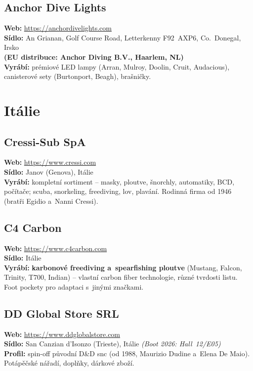 \documentclass[11pt,a4paper]{article}
\begin{document}
\subsection{Anchor Dive Lights}
\textbf{Web:} \url{https://anchordivelights.com} \\
\textbf{Sídlo:} An Grianan, Golf Course Road, Letterkenny F92~AXP6, Co.~Donegal, Irsko \\
\textbf{(EU distribuce: Anchor Diving B.V., Haarlem, NL)} \\
\textbf{Vyrábí:} prémiové LED lampy (Arran, Mulroy, Doolin, Cruit, Audacious), canisterové sety (Burtonport, Beagh), brašničky.

\section{Itálie}

\subsection{Cressi-Sub SpA}
\textbf{Web:} \url{https://www.cressi.com} \\
\textbf{Sídlo:} Janov (Genova), Itálie \\
\textbf{Vyrábí:} kompletní sortiment -- masky, ploutve, šnorchly, automatiky, BCD, počítače; scuba, snorkeling, freediving, lov, plavání. Rodinná firma od 1946 (bratři Egidio a~Nanni Cressi).

\subsection{C4 Carbon}
\textbf{Web:} \url{https://www.c4carbon.com} \\
\textbf{Sídlo:} Itálie \\
\textbf{Vyrábí:} \textbf{karbonové freediving a~spearfishing ploutve} (Mustang, Falcon, Trinity, T700, Indian) -- vlastní carbon fiber technologie, různé tvrdosti listu. Foot pockety pro adaptaci s~jinými značkami.

\subsection{DD Global Store SRL}
\textbf{Web:} \url{https://www.ddglobalstore.com} \\
\textbf{Sídlo:} San Canzian d'Isonzo (Trieste), Itálie \quad\emph{(Boot 2026: Hall~12/E05)} \\
\textbf{Profil:} spin-off původní D\&D snc (od 1988, Maurizio Dudine a~Elena De Maio). Potápěčské nářadí, doplňky, dárkové zboží.
\end{document}
